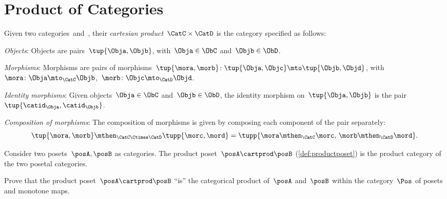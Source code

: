 

\section{Product of Categories}



\begin{ctdefinition}
    \label{def:cartesian-product-category}
    Given two categories~\CatC and~\CatD, their \emph{cartesian product}~$\CatC \times \CatD$ is the category specified as follows:
    \begin{compactenum}
        \item \emph{Objects}: Objects are pairs~$\tup{\Obja,\Objb}$, with~$\Obja\in \ObC$ and~$\Objb\in \ObD$.
        \item \emph{Morphisms}: Morphisms are pairs of morphisms~$\tup{\mora,\morb} \colon \tup{\Obja,\Objc}\mto \tup{\Objb,\Objd}$, with~$\mora\colon \Obja \mto_\CatC \Objb$,~$\morb\colon \Objc\mto_\CatD \Objd$.
        \item \emph{Identity morphisms}: Given objects~$\Obja\in \ObC$ and~$\Objb\in \ObD$, the identity morphism on~$\tup{\Obja,\Objb}$ is the pair $\tup{\catid_\Obja ,\catid_\Objb}$.
        \item \emph{Composition of morphisms}: The composition of morphisms is given by composing each component of the pair separately:
        \begin{equation}
            \tup{\mora,\morb}\mthen_{\CatC\Ctimes\CatD} \tupp{\morc,\mord}=\tupp{\mora\mthen_{\CatC}\morc,\, \morb \mthen_{\CatD} \mord}.
        \end{equation}
    \end{compactenum}
\end{ctdefinition}


\begin{example}
    Consider two posets~$\posA,\posB$ as categories.
    The product poset~$\posA\cartprod \posB$ (\cref{def:productposet}) is the product category of the two posetal categories.
\end{example}

\begin{gradedexercise}
    Prove that the product poset~$\posA \cartprod \posB$ ``is'' the categorical product of~$\posA$ and~$\posB$ within the category~$\Pos$ of posets and monotone maps.
\end{gradedexercise}

